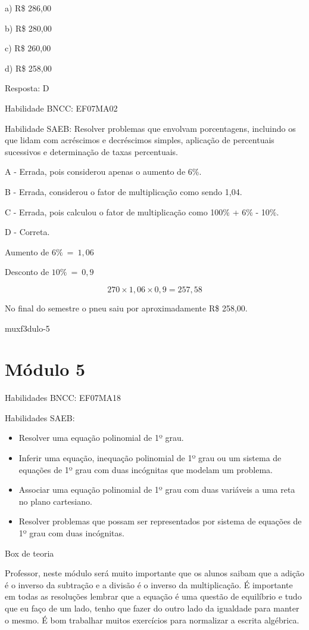 {a) R\$ 286,00

b) R\$ 280,00

c) R\$ 260,00

d) R\$ 258,00

Resposta: D

Habilidade BNCC: EF07MA02

Habilidade SAEB: Resolver problemas que envolvam porcentagens, incluindo
os que lidam com acréscimos e decréscimos simples, aplicação de
percentuais sucessivos e determinação de taxas percentuais.

A - Errada, pois considerou apenas o aumento de 6\%.

B - Errada, considerou o fator de multiplicação como sendo 1,04.

C - Errada, pois calculou o fator de multiplicação como 100\% + 6\% -
10\%.

D - Correta.

Aumento de \(6\%\  = \ 1,06\)

Desconto de \(10\%\  = \ 0,9\)

\[270 \times 1,06 \times 0,9 = 257,58\]

No final do semestre o pneu saiu por aproximadamente R\$ 258,00.

muxf3dulo-5}{%
\section{Módulo 5}

Habilidades BNCC: EF07MA18

Habilidades SAEB:

\begin{itemize}
\item
  Resolver uma equação polinomial de 1º grau.
\item
  Inferir uma equação, inequação polinomial de 1º grau ou um sistema de
  equações de 1º grau com duas incógnitas que modelam um problema.
\item
  Associar uma equação polinomial de 1º grau com duas variáveis a uma
  reta no plano cartesiano.
\item
  Resolver problemas que possam ser representados por sistema de
  equações de 1º grau com duas incógnitas.
\end{itemize}

Box de teoria

Professor, neste módulo será muito importante que os alunos saibam que a
adição é o inverso da subtração e a divisão é o inverso da
multiplicação. É importante em todas as resoluções lembrar que a equação
é uma questão de equilíbrio e tudo que eu faço de um lado, tenho que
fazer do outro lado da igualdade para manter o mesmo. É bom trabalhar
muitos exercícios para normalizar a escrita algébrica.

}
